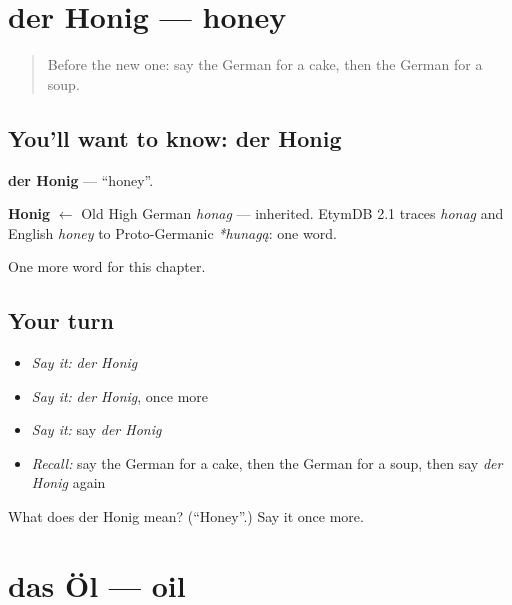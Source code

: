 \section[der Honig]{der Honig — honey}

\label{lesson:GE-C71-honig}



\begin{quote}
Before the new one: say the German for a cake, then the German for a soup.
\end{quote}

\subsection*{You'll want to know: der Honig}
\textbf{der Honig} — \textquotedblleft{}honey\textquotedblright{}.

\begin{cousinweb}
\textbf{Honig} $\leftarrow$ Old High German \emph{honag} — inherited. EtymDB 2.1 traces \emph{honag} and English \emph{honey} to Proto-Germanic \emph{*hunagą}: one word.
\end{cousinweb}

\begin{grammarlens}[title={What you've built}]
One more word for this chapter.
\end{grammarlens}

\subsection*{Your turn}
\begin{itemize}
\raggedright
  \item \emph{Say it:} \emph{der Honig}
  \item \emph{Say it:} \emph{der Honig}, once more
  \item \emph{Say it:} say \emph{der Honig}
  \item \emph{Recall:} say the German for a cake, then the German for a soup, then say \emph{der Honig} again
\end{itemize}

\begin{tcolorbox}[breakable,colback=teal!4,colframe=teal!35!black,title={Before you move on}]
What does der Honig mean? (\textquotedblleft{}Honey\textquotedblright{}.) Say it once more.
\end{tcolorbox}
\section[das Öl]{das Öl — oil}

